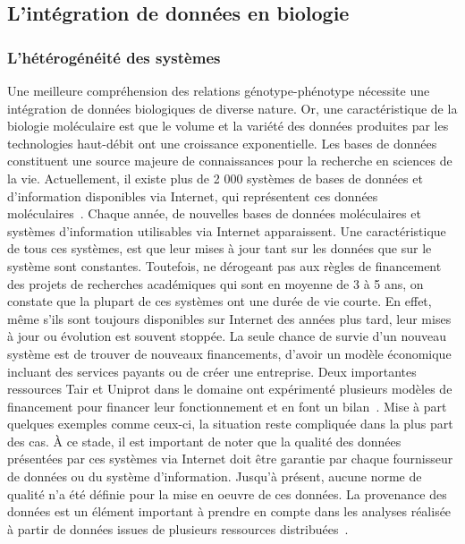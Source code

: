 \subsection{L'intégration de données en biologie}
\subsubsection{L'hétérogénéité des systèmes}
Une meilleure compréhension des relations génotype-phénotype nécessite une intégration de données biologiques de diverse nature. Or, une caractéristique de la biologie moléculaire est que le volume et la variété des données produites par les technologies haut-débit ont une croissance exponentielle. Les bases de données constituent une source majeure de connaissances pour la recherche en sciences de la vie. Actuellement, il existe plus de 2 000 systèmes de bases de données et d'information disponibles via Internet, qui représentent ces données moléculaires~\cite{NAR2019}. Chaque année, de nouvelles bases de données moléculaires et systèmes d’information utilisables via Internet apparaissent. Une caractéristique de tous ces systèmes, est que leur mises à jour tant sur les données que sur le système sont constantes. Toutefois, ne dérogeant pas aux règles de financement des projets de recherches académiques qui sont en moyenne de 3 à 5 ans, on constate que la plupart de ces systèmes ont une durée de vie courte. En effet, même s'ils sont toujours disponibles sur Internet des années plus tard, leur mises à jour ou évolution est souvent stoppée. La seule chance de survie d’un nouveau système est de trouver de nouveaux financements, d'avoir un modèle économique incluant des services payants ou de créer une entreprise. Deux importantes ressources Tair et Uniprot dans le domaine ont expérimenté plusieurs modèles de financement pour financer leur fonctionnement et en font un bilan~\cite{TAIR_sustainable_2016,Uniprot_funding_2017}. Mise à part quelques exemples comme ceux-ci, la situation reste compliquée dans la plus part des cas.  À ce stade, il est important de noter que la qualité des données présentées par ces systèmes via Internet doit être garantie par chaque fournisseur de données ou du système d’information. Jusqu'à présent, aucune norme de qualité n'a été définie pour la mise en oeuvre de ces données. La provenance des données est un élément important à prendre en compte dans les analyses réalisée à partir de données issues de plusieurs ressources distribuées~\cite{ICDE2011}.\\

